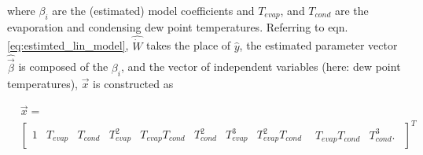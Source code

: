 where $\beta_i$ are the (estimated) model coefficients and $T_{evap}$, and $T_{cond}$ are the evaporation and condensing dew point temperatures. Referring to eqn. \ref{eq:estimted_lin_model}, $\hat {\dot W}$ takes the place of $\hat y$, the estimated parameter vector  $\hat {\vec \beta}$ is composed of the $\beta_i$, and the vector of independent variables (here: dew point temperatures), $\vec x$ is constructed as

\begin{equation}
\begin{split}
&\vec x = \\
&{\left[ {\begin{array}{*{20}{c}}
  1&{{T_{evap}}}&{{T_{cond}}}&{T_{evap}^2}&{{T_{evap}}{T_{cond}}}&{T_{cond}^2}&{T_{evap}^3}&{T_{evap}^2{T_{cond}}}&{\begin{array}{*{20}{c}}
  {{T_{evap}}{T_{cond}}}&{T_{cond}^3} .
\end{array}} 
\end{array}} \right]^T}
\end{split}
\label{eq:lin_reg_temp_vec}
\end{equation}
